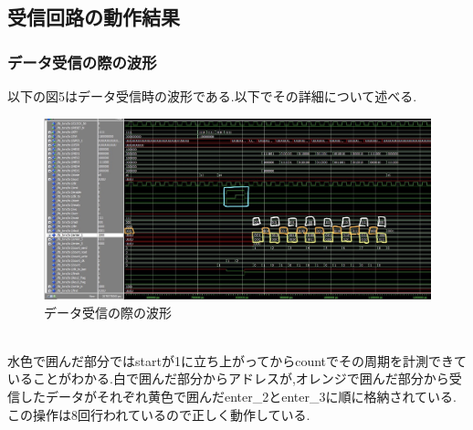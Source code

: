 \documentclass[dvipdfmx]{jarticle}
\begin{document}
\subsection{受信回路の動作結果}
\subsubsection{データ受信の際の波形}
以下の図5はデータ受信時の波形である.以下でその詳細について述べる.
\begin{figure}[h]
  \centering
  \includegraphics[width=12cm]{wave_send.jpg}
  \caption{データ受信の際の波形}
\end{figure}
\\水色で囲んだ部分ではstartが1に立ち上がってからcountでその周期を計測できていることがわかる.白で囲んだ部分からアドレスが,オレンジで囲んだ部分から受信したデータがそれぞれ黄色で囲んだenter\_2とenter\_3に順に格納されている.
この操作は8回行われているので正しく動作している.
\end{document}
